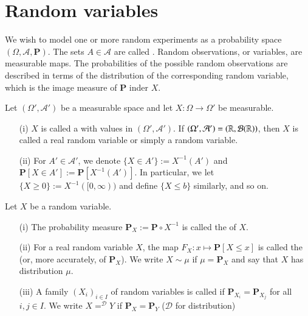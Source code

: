\documentclass[12pt, a4paper, oneside, openright, titlepage]{book}
\begin{document}
\section{Random variables}

We wish to model one or more random experiments as a probability space $(\Omega,\mathcal{A},\mathbf{P})$. The sets $A \in \mathcal{A}$ are called . Random observations, or variables, are measurable maps. The probabilities of the possible random observations are described in terms of the distribution of the corresponding random variable, which is the image measure of $\mathbf{P}$ inder $X$.

\begin{defn}
    Let $(\Omega',\mathcal{A}')$ be a measurable space and let $X:\Omega\rightarrow \Omega'$ be measurable. \begin{itemize}
        \item[(i)] $X$ is called a  with values in $(\Omega',\mathcal{A}')$. If $(\Omega',\mathcal{A}') = (\mathbb R,\mathcal{B}(\mathbb R))$, then $X$ is called a real random variable or simply a random variable.
        \item[(ii)] For $A' \in \mathcal{A}'$, we denote $\{X \in A'\} := X^{-1}(A')$ and $\mathbf{P}[X\in A'] := \mathbf{P}[X^{-1}(A')]$. In particular, we let $\{X\geq 0\} := X^{-1}([0,\infty))$ and define $\{X\leq b\}$ similarly, and so on.
    \end{itemize}
\end{defn}

\begin{defn}[Distributions]
    Let $X$ be a random variable. \begin{itemize}
        \item[(i)] The probability measure $\mathbf{P}_X := \mathbf{P}\circ X^{-1}$ is called the  of $X$.
        \item[(ii)] For a real random variable $X$, the map $F_X:x\mapsto \mathbf{P}[X\leq x]$ is called the  (or, more accurately, of $\mathbf{P}_X$). We write $X\sim \mu$ if $\mu = \mathbf{P}_X$ and say that $X$ has distribution $\mu$.
        \item[(iii)] A family $(X_i)_{i \in I}$ of random variables is called  if $\mathbf{P}_{X_i} = \mathbf{P}_{X_j}$ for all $i,j \in I$. We write $X =^{\mathcal{D}} Y$ if $\mathbf{P}_X = \mathbf{P}_Y$ ($\mathcal{D}$ for distribution)
    \end{itemize}
\end{defn}
\end{document}
